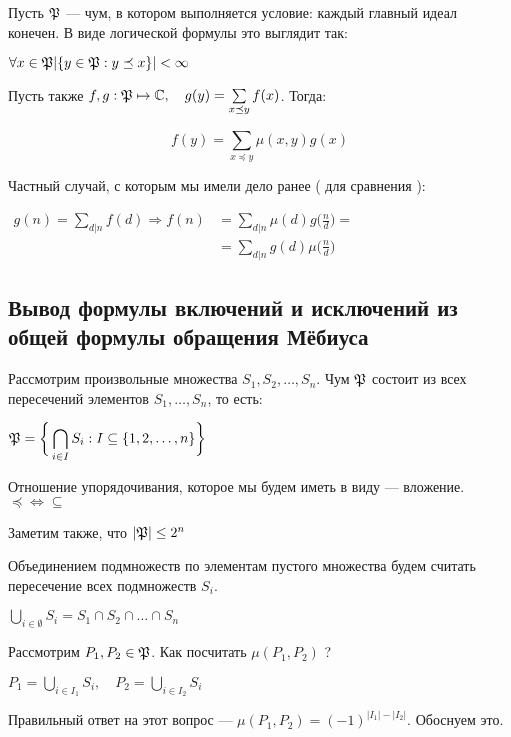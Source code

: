 Пусть $\mathfrak{P}$ --- чум, в котором выполняется условие: каждый главный идеал конечен. В виде логической формулы это выглядит так:

$\forall x \in \mathfrak{P} | \{ y \in \mathfrak{P} : y \preceq x\} | < \infty $ 

Пусть также $f,g : \mathfrak{P} \mapsto \mathbb{C}, \quad g(y) = \sum \limits 
_{x
\preceq
y
}
f(x)  $. Тогда:

\[\displaystyle
 f(y) = \sum \limits _{
x \preceq
y
}
\mu(x,y) g(x)
\]


Частный случай, с которым мы имели дело ранее ( для сравнения ):

$
\begin{aligned}
g(n) = \sum \limits _{d|n} f(d) \Rightarrow 
f(n)  &  = \sum \limits _{d | n} \mu(d) g \bigg ( \frac n d \bigg )=\\
& = \sum \limits _{d|n} g(d) \mu \bigg ( \frac n d \bigg )
\end{aligned}
$




\subsection{Вывод формулы включений и исключений из общей формулы обращения Мёбиуса}


Рассмотрим произвольные множества $S_1, S_2,\dots, S_n $.
Чум $\mathfrak{P}$ состоит из всех пересечений элементов $S_1, \dots , S_n$, то есть:

$\displaystyle
\mathfrak{P} = \bigg\{ \bigcap _{i \in I}S_i : I \subseteq \{ 1,2, \dots, n\} \bigg \}
$

Отношение упорядочивания, которое мы будем иметь в виду --- вложение. 
$\preceq \Longleftrightarrow \subseteq$

Заметим также, что $|\mathfrak{P}| \leq 2^n$

\begin{rem}
Объединением подмножеств по элементам пустого множества будем считать пересечение всех подмножеств $S_i$.

$\displaystyle \bigcup \limits _{i \in \emptyset}S_i = S_1 \cap S_2 \cap \dots \cap S_n $
\end{rem}

Рассмотрим $P_1, P_2 \in \mathfrak{P} $. Как посчитать $\mu ( P_1, P_2 )$ ?

$\displaystyle
P_1 = \bigcup \limits _{i \in I_1} S_i, \quad P_2 = \bigcup \limits _{i \in I_2} S_i$

Правильный ответ на этот вопрос --- $\mu ( P_1, P_2 ) = (-1) ^ {|I_1| - |I_2|} $. Обоснуем это.


